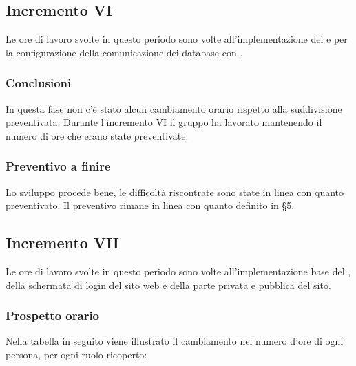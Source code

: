 			
			
		\subsection{Incremento VI }
			Le ore di lavoro svolte in questo periodo sono volte all'implementazione dei   e per la configurazione della comunicazione dei database con .
		
		\subsubsection{Conclusioni}
			In questa fase non c'è stato alcun cambiamento orario rispetto alla suddivisione preventivata.
			Durante l'incremento VI il gruppo ha lavorato mantenendo il numero di ore che erano state preventivate. 
		
		\subsubsection{Preventivo a finire}
			Lo sviluppo procede bene, le difficoltà riscontrate sono state in linea con quanto preventivato.
			Il preventivo rimane in linea con quanto definito in \S5.
		\pagebreak
			
		
	
		\subsection{Incremento VII}
			Le ore di lavoro svolte in questo periodo sono volte all'implementazione base del , della schermata di login del sito web e della parte privata e pubblica del sito.
			\subsubsection{Prospetto orario}
			Nella tabella in seguito viene illustrato il cambiamento nel numero d'ore di ogni persona, per ogni ruolo ricoperto:
		
